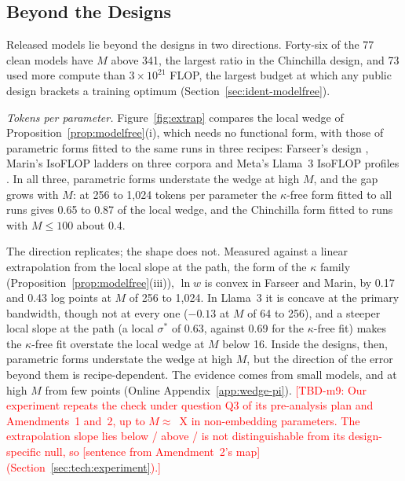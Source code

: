 \subsection{Beyond the Designs}\label{sec:wedge-pi}

Released models lie beyond the designs in two directions. Forty-six of the 77 clean models have $M$ above 341, the
largest ratio in the Chinchilla design, and 73 used more compute than $3\times10^{21}$ FLOP, the largest budget at which
any public design brackets a training optimum (Section~\ref{sec:ident-modelfree}).

\textit{Tokens per parameter.} Figure~\ref{fig:extrap} compares the local wedge of Proposition~\ref{prop:modelfree}(i),
which needs no functional form, with those of parametric forms fitted to the same runs in three recipes: Farseer's
design \citep{li2025predictableb}, Marin's IsoFLOP ladders on three corpora \citep{marin2026ladders} and Meta's Llama~3
IsoFLOP profiles \citep{grattafiori2024llama,czech2026llama3isoflop}. In all three, parametric forms understate the
wedge at high $M$, and the gap grows with $M$: at 256 to 1,024 tokens per parameter the $\kappa$-free form fitted to all
runs gives 0.65 to 0.87 of the local wedge, and the Chinchilla form fitted to runs with $M\le100$ about 0.4.

The direction replicates; the shape does not. Measured against a linear extrapolation from the local slope at the path,
the form of the $\kappa$ family (Proposition~\ref{prop:modelfree}(iii)), $\ln w$ is convex in Farseer and Marin, by 0.17
and 0.43 log points at $M$ of 256 to 1,024. In Llama~3 it is concave at the primary bandwidth, though not at every one
($-0.13$ at $M$ of 64 to 256), and a steeper local slope at the path (a local $\sigma^*$ of 0.63, against 0.69 for the
$\kappa$-free fit) makes the $\kappa$-free fit overstate the local wedge at $M$ below 16. Inside the designs, then,
parametric forms understate the wedge at high $M$, but the direction of the error beyond them is recipe-dependent. The
evidence comes from small models, and at high $M$ from few points (Online Appendix~\ref{app:wedge-pi}).
\textcolor{red}{[TBD-m9: Our experiment repeats the check under question Q3 of its pre-analysis plan and Amendments~1
and~2, up to $M\approx$~X in non-embedding parameters. The extrapolation slope lies below / above / is not
distinguishable from its design-specific null, so [sentence from Amendment~2's map]
(Section~\ref{sec:tech:experiment}).]}

